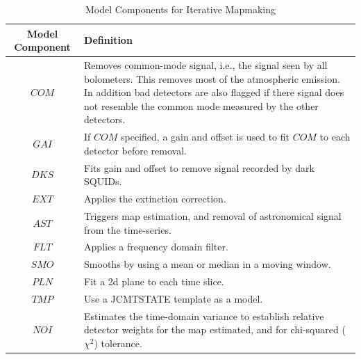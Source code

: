 \documentclass[oneside,11pt]{starlink}
\begin{document}
\begin{table}
\begin{tabular}{cp{10cm}}
 Model Component & Definition \\
\hline
$COM$ & Removes common-mode signal, i.e., the signal seen by all bolometers. This removes most of the atmospheric emission. In addition bad detectors are also flagged if there signal does not resemble the common mode measured by the other detectors. \\
$GAI$ & If $COM$ specified, a gain and offset is used to fit $COM$ to each detector before removal. \\
$DKS$ & Fits gain and offset to remove signal recorded by dark SQUIDs. \\
$EXT$ & Applies the extinction correction. \\
$AST$ & Triggers map estimation, and removal of astronomical signal from the time-series. \\
$FLT$ & Applies a frequency domain filter. \\
$SMO$ & Smooths by using a mean or median in a moving window. \\
$PLN$ & Fit a 2d plane to each time slice. \\
$TMP$ & Use a JCMTSTATE template as a model. \\
$NOI$ & Estimates the time-domain variance to establish relative detector weights for the map estimated, and for chi-squared ($\chi^2$) tolerance. \\
\hline
\end{tabular}
\caption{Model Components for Iterative Mapmaking}
\label{tab:dimm_components}
\end{table}
\end{document}
